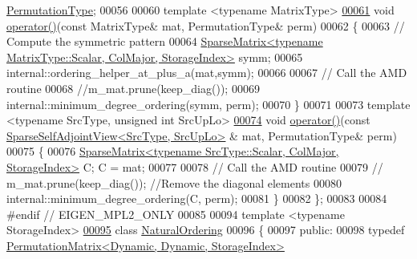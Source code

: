 \begin{DoxyCode}
       \hyperlink{group___core___module}{PermutationType};
00056     
00060     \textcolor{keyword}{template} <\textcolor{keyword}{typename} MatrixType>
\hyperlink{group___ordering_methods___module_afce433557abcba9e49fa81581a58fa51}{00061}     \textcolor{keywordtype}{void} \hyperlink{group___ordering_methods___module_afce433557abcba9e49fa81581a58fa51}{operator()}(\textcolor{keyword}{const} MatrixType& mat, PermutationType& perm)
00062     \{
00063       \textcolor{comment}{// Compute the symmetric pattern}
00064       \hyperlink{group___sparse_core___module_class_eigen_1_1_sparse_matrix}{SparseMatrix<typename MatrixType::Scalar, ColMajor, StorageIndex>}
       symm;
00065       internal::ordering\_helper\_at\_plus\_a(mat,symm); 
00066     
00067       \textcolor{comment}{// Call the AMD routine }
00068       \textcolor{comment}{//m\_mat.prune(keep\_diag());}
00069       internal::minimum\_degree\_ordering(symm, perm);
00070     \}
00071     
00073     \textcolor{keyword}{template} <\textcolor{keyword}{typename} SrcType, \textcolor{keywordtype}{unsigned} \textcolor{keywordtype}{int} SrcUpLo> 
\hyperlink{group___ordering_methods___module_a7f3fd7224b084f0f5655c97ea8eb6466}{00074}     \textcolor{keywordtype}{void} \hyperlink{group___ordering_methods___module_a7f3fd7224b084f0f5655c97ea8eb6466}{operator()}(\textcolor{keyword}{const} \hyperlink{group___sparse_core___module_class_eigen_1_1_sparse_self_adjoint_view}{SparseSelfAdjointView<SrcType, SrcUpLo>}
      & mat, PermutationType& perm)
00075     \{ 
00076       \hyperlink{group___sparse_core___module_class_eigen_1_1_sparse_matrix}{SparseMatrix<typename SrcType::Scalar, ColMajor, StorageIndex>}
       C; C = mat;
00077       
00078       \textcolor{comment}{// Call the AMD routine }
00079       \textcolor{comment}{// m\_mat.prune(keep\_diag()); //Remove the diagonal elements }
00080       internal::minimum\_degree\_ordering(C, perm);
00081     \}
00082 \};
00083 
00084 \textcolor{preprocessor}{#endif // EIGEN\_MPL2\_ONLY}
00085 
00094 \textcolor{keyword}{template} <\textcolor{keyword}{typename} StorageIndex>
\hyperlink{group___ordering_methods___module}{00095} \textcolor{keyword}{class }\hyperlink{group___ordering_methods___module_class_eigen_1_1_natural_ordering}{NaturalOrdering}
00096 \{
00097   \textcolor{keyword}{public}:
00098     \textcolor{keyword}{typedef} \hyperlink{group___core___module}{PermutationMatrix<Dynamic, Dynamic, StorageIndex>}

\end{DoxyCode}
